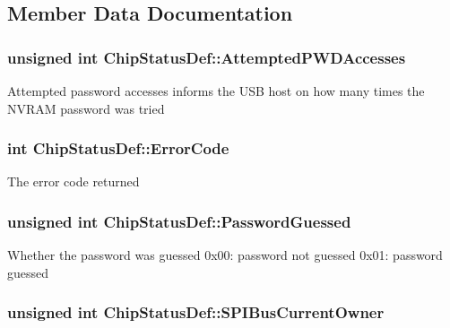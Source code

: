 \subsection{\-Member \-Data \-Documentation}
\hypertarget{struct_chip_status_def_a775f8cb07137f324ce59e7bbc961fd55}{
\subsubsection[{\-Attempted\-P\-W\-D\-Accesses}]{\setlength{\rightskip}{0pt plus 5cm}unsigned int {\bf \-Chip\-Status\-Def\-::\-Attempted\-P\-W\-D\-Accesses}}}\label{struct_chip_status_def_a775f8cb07137f324ce59e7bbc961fd55}
\-Attempted password accesses informs the \-U\-S\-B host on how many times the \-N\-V\-R\-A\-M password was tried \hypertarget{struct_chip_status_def_ab359484a0244ec153c49f0af23c2d29b}{
\subsubsection[{\-Error\-Code}]{\setlength{\rightskip}{0pt plus 5cm}int {\bf \-Chip\-Status\-Def\-::\-Error\-Code}}}\label{struct_chip_status_def_ab359484a0244ec153c49f0af23c2d29b}
\-The error code returned \hypertarget{struct_chip_status_def_ae83bf4d444de30c1a451f9aef7ce4d6f}{
\subsubsection[{\-Password\-Guessed}]{\setlength{\rightskip}{0pt plus 5cm}unsigned int {\bf \-Chip\-Status\-Def\-::\-Password\-Guessed}}}\label{struct_chip_status_def_ae83bf4d444de30c1a451f9aef7ce4d6f}
\-Whether the password was guessed 0x00\-: password not guessed 0x01\-: password guessed \hypertarget{struct_chip_status_def_ac8d8808a7cf921e77831dc4e30e8d096}{
\subsubsection[{\-S\-P\-I\-Bus\-Current\-Owner}]{\setlength{\rightskip}{0pt plus 5cm}unsigned int {\bf \-Chip\-Status\-Def\-::\-S\-P\-I\-Bus\-Current\-Owner}}}\label{struct_chip_status_def_ac8d8808a7cf921e77831dc4e30e8d096}
